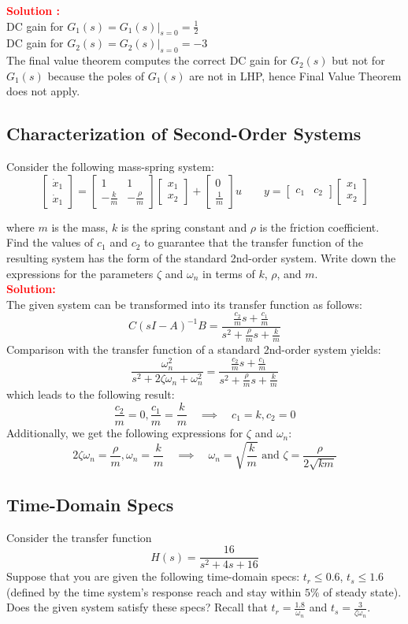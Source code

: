 \documentclass[12pt]{article}
\newcommand{\bmat}[1]{\begin{bmatrix} #1 \end{bmatrix}}
\begin{document}
\textbf{\textcolor{red}{Solution :}} \\
DC gain for $G_1(s) = G_1(s)|_{s=0} =\frac{1}{2}$ \\
DC gain for $G_2(s) = G_2(s)|_{s=0} = -3$ \\
The final value theorem computes the correct DC gain for $G_2(s)$ but not for $G_1(s)$ because the poles of $G_1(s)$ are not in LHP, hence Final Value Theorem does not apply.

\clearpage
\subsection{Characterization of Second-Order Systems}

Consider the following mass-spring system:
\[
\bmat{\dot{x}_1 \\ \dot{x}_1} = \bmat{1 & 1 \\ -\frac{k}{m} & -\frac{\rho}{m}}\bmat{x_1 \\ x_2} +\bmat{0 \\ \frac{1}{m}}u \qquad y=\bmat{c_1 & c_2} \bmat{x_1 \\ x_2}
\]

where $m$ is the mass, $k$ is the spring constant and $\rho$ is the friction coefficient. Find the values of $c_1$ and $c_2$ to guarantee that the transfer function of the resulting system has the form of the
standard 2nd-order system. Write down the expressions for the parameters $\zeta$ and $\omega_n$ in terms of $k$, $\rho$, and $m$. \\

\noindent \textbf{\textcolor{red}{Solution:}} \\
The given system can be transformed into its transfer function as follows:
\[
C(s I -A)^{-1}B=\frac{\frac{c_2}{m}s+\frac{c_1}{m}}{s^2+\frac{\rho}{m}s+\frac{k}{m}}
\]
Comparison with the transfer function of a standard 2nd-order system yields:
\[
\frac{\omega_n^2}{s^2+2 \zeta \omega_n+\omega_n^2}=\frac{\frac{c_2}{m}s+\frac{c_1}{m}}{s^2+\frac{\rho}{m}s+\frac{k}{m}}
\]
which leads to the following result:
\[
\frac{c_2}{m}=0, \frac{c_1}{m}=\frac{k}{m} \quad \implies \quad c_1=k,c_2=0
\]
Additionally, we get the following expressions for $\zeta$ and $\omega_n$:
\[
2 \zeta \omega_n=\frac{\rho}{m}, \omega_n=\frac{k}{m} \quad \implies \quad \omega_n=\sqrt{\frac{k}{m}} \text{  and  } \zeta=\frac{\rho}{2 \sqrt{k m}}
\]

\clearpage
\subsection{Time-Domain Specs}
Consider the transfer function 
\[
H(s)=\frac{16}{s^2+4s+16}
\]
Suppose that you are given the following time-domain specs: $t_r \leq 0.6$, $t_s \leq 1.6$ (defined by the time system's response reach and stay within $5\%$ of steady state). Does the given system satisfy these specs? Recall that $t_r=\frac{1.8}{\omega_n}$ and $t_s=\frac{3}{\zeta \omega_n}$. \\
\end{document}
